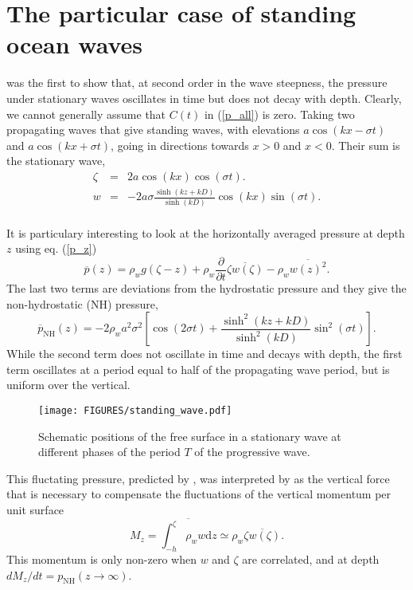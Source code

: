 \section{The particular case of standing ocean waves}
\cite{Miche1944b} was the first to show that, at second order in the wave steepness, the pressure under stationary waves oscillates in time but does not decay with depth. Clearly, 
we cannot generally assume that $C(t)$ in (\ref{p_all}) is zero.  
Taking two propagating waves that give standing waves, with elevations $a \cos(kx - \sigma t)$ and $a \cos(kx + \sigma t)$, going in directions towards  $x>0$ and $x<0$. Their sum is 
the stationary wave,
\begin{eqnarray}
 \zeta &=& 2 a \cos(kx) \cos (\sigma t).\\
 w &=& - 2 a \sigma \frac{\sinh(kz + kD)}{\sinh(kD)} \cos(kx) \sin (\sigma t).\\
\end{eqnarray}

It is particulary interesting to look at the horizontally averaged pressure at depth $z$ using eq. 
(\ref{p_z}) 
\begin{equation}
\overline{p}(z)= \rho_w g (\zeta -z) + \rho_w \frac{\partial }{\partial t}\overline{\zeta w(\zeta)} -\rho_w \overline{w(z)^2}.
\end{equation}
The last two terms are deviations from the hydrostatic pressure and they give the non-hydrostatic (NH) pressure,  
\begin{equation}
\overline{p}_{\mathrm{NH}}(z)=-2 \rho_w  a^2 \sigma^2 \left[   \cos(2 \sigma t)  + \frac{\sinh^2(kz+kD)}{\sinh^2(kD)}  \sin^2(\sigma t)   \right].\label{sismo:p_NH}
\end{equation}
While the second term does not oscillate in time and decays with depth, the first term 
oscillates at a period equal to half of the propagating wave period, but is uniform over the vertical. 
\begin{figure}
\centerline{\texttt{[image: FIGURES/standing\_wave.pdf]}}
  \caption{Schematic positions of the free surface in a stationary wave at different phases of the period $T$ of the progressive wave.}
\label{fig:standing}
\end{figure}

This fluctating pressure, predicted by \cite{Miche1944b}, was interpreted by \cite{Longuet-Higgins1950} as the vertical force that is necessary 
to compensate the fluctuations of the vertical momentum per unit surface 
\begin{equation}
M_z=\overline{\int_{-h}^{\zeta}\rho_w w {\mathrm d}z} \simeq \rho_w \overline{\zeta w(\zeta)}.
\end{equation}
This momentum is only non-zero when  $w$ and $\zeta$ are correlated, and at depth $d M_z /dt = p_{\mathrm{NH}} (z \rightarrow \infty)$. 

